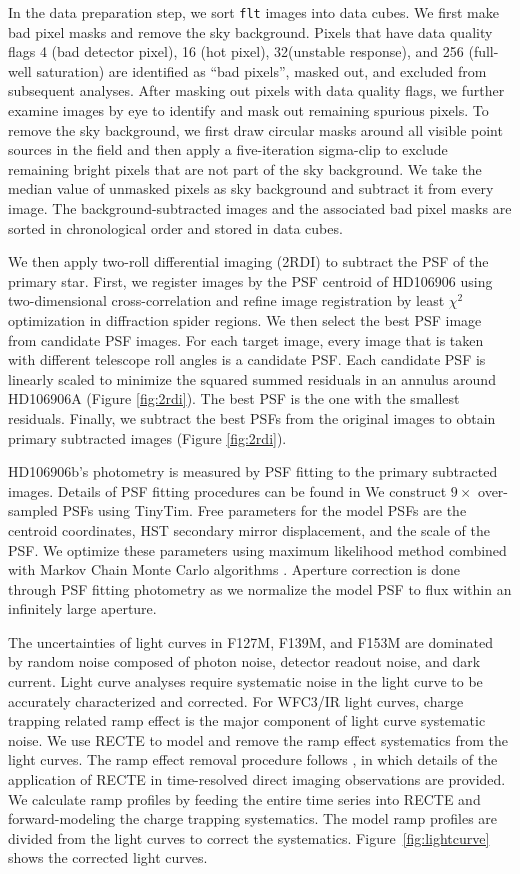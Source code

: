 \documentclass[twocolumn]{aastex62}
\begin{document}
In the data preparation step, we sort \texttt{flt} images into data cubes. We first make bad pixel masks and remove the sky background. Pixels that have data quality flags 4 (bad detector pixel), 16 (hot pixel), 32(unstable response), and 256 (full-well saturation) are identified as ``bad pixels'', masked out, and excluded from subsequent analyses. After masking out pixels with data quality flags, we further examine images by eye to identify and mask out remaining spurious pixels. To remove the sky background, we first draw circular masks around all visible point sources in the field and then apply a five-iteration sigma-clip to exclude remaining bright pixels that are not part of the sky background. We take the median value of unmasked pixels as sky background and subtract it from every image. The background-subtracted images and the associated bad pixel masks are sorted in chronological order and stored in data cubes.

We then apply two-roll differential imaging (2RDI) to subtract the PSF of the primary star. First, we register images by the PSF centroid of HD106906 using two-dimensional cross-correlation and refine image registration by least $\chi^{2}$ optimization in diffraction spider regions. We then select the best PSF image from candidate PSF images. For each target image,  every image that is taken with different telescope roll angles is a candidate PSF. Each candidate PSF is linearly scaled to minimize the squared summed residuals in an annulus around HD106906A (Figure \ref{fig:2rdi}). The best PSF is the one with the smallest residuals. Finally, we subtract the best PSFs from the original images to obtain primary subtracted images (Figure \ref{fig:2rdi}). 

HD106906b's photometry is measured by PSF fitting to the primary subtracted images. Details of PSF fitting procedures can be found in \citet{Zhou2019} We construct $9\times$ over-sampled PSFs using TinyTim. Free parameters for the model PSFs are the centroid coordinates, HST secondary mirror displacement, and the scale of the PSF. We optimize these parameters using maximum likelihood method combined with Markov Chain Monte Carlo algorithms \citep{Foreman-Mackey2012}. Aperture correction is done through PSF fitting photometry as we normalize the model PSF to flux within an infinitely large aperture. 

The uncertainties of light curves in F127M, F139M, and F153M are dominated by random noise composed of  photon noise, detector readout noise, and dark current. Light curve analyses require systematic noise in the light curve to be accurately characterized and corrected. For WFC3/IR light curves, charge trapping related ramp effect is the major component of light curve systematic noise. We use RECTE \citep{Zhou2017} to model and remove the ramp effect systematics from the light curves. The ramp effect removal procedure follows \citet{Zhou2019}, in which details of the application of RECTE in time-resolved direct imaging observations are provided. We calculate ramp profiles by feeding the entire time series into RECTE and forward-modeling the charge trapping systematics. The model ramp profiles are divided from the light curves to correct the systematics. Figure~\ref{fig:lightcurve} shows the corrected light curves.
\end{document}
